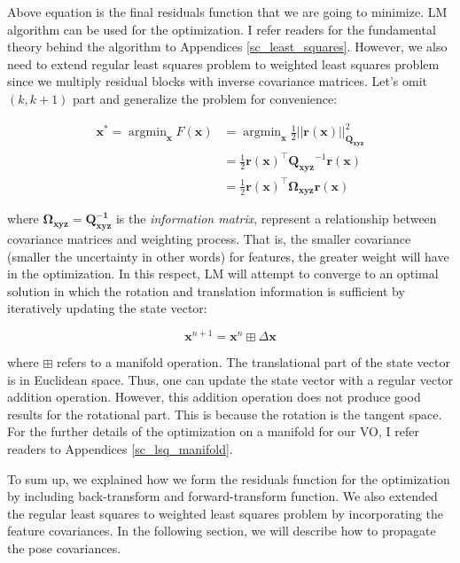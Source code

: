 \documentclass[12pt]{report}
\numberwithin{figure}{section}
\newcommand{\argmin}{\mathop{\mathrm{argmin}}}
\begin{document}
Above equation is the final residuals function that we are going to minimize.
LM algorithm can be used for the optimization. I refer readers for the
fundamental theory behind the algorithm to Appendices
\ref{sc_least_squares}.  However, we also need to extend regular least squares
problem to weighted least squares problem since we multiply residual blocks
with inverse covariance matrices.  Let's omit $(k,k+1)$ part and generalize the
problem for convenience:

\begin{equation} \begin{aligned} \mathbf{x}^* = \argmin_{\mathbf{x}}
F(\mathbf{x}) & = \argmin_{\mathbf{x}} \frac{1}{2}
||\mathbf{r}(\mathbf{x})||^2_{\mathbf{Q_{xyz}}} \\ & = \frac{1}{2}
\mathbf{r}(\mathbf{x})^\top \mathbf{Q_{xyz}}^{-1} \mathbf{r}(\mathbf{x}) 
\\ & =
\frac{1}{2} \mathbf{r}(\mathbf{x})^\top \mathbf{\Omega}_{\mathbf{xyz}}
\mathbf{r}(\mathbf{x}) \end{aligned}
\end{equation}\label{eq:residuals_objective}

where $\mathbf{\Omega_{xyz} = Q^{-1}_{xyz}}$ is the \textit{information
matrix}, represent a relationship between covariance matrices and weighting
process.  That is, the smaller covariance (smaller the uncertainty in other
words) for features, the greater weight will have in the optimization.  In this
respect, LM will attempt to converge to an optimal solution in which the
rotation and translation information is sufficient by iteratively updating the
state vector:

\begin{equation} \mathbf{x}^{n+1} = \mathbf{x}^{n} \boxplus \Delta \mathbf{x}
\end{equation}

where $\boxplus$ refers to a manifold operation.  The translational part of the
state vector is in Euclidean space. Thus, one can update the state vector with
a regular vector addition operation.  However, this addition operation does not
produce good results for the rotational part. This is because the rotation is
the tangent space.  For the further details of the optimization on a manifold
for our VO, I refer readers to Appendices \ref{sc_lsq_manifold}.

To sum up, we explained how we form the residuals function for the optimization
by including back-transform and forward-transform function. We also extended
the regular least squares to weighted least squares problem by incorporating
the feature covariances. In the following section, we will describe how to
propagate the pose covariances.
\end{document}
